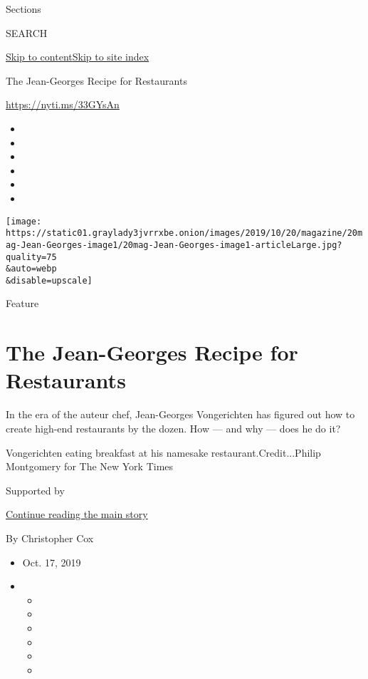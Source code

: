 Sections

SEARCH

\protect\hyperlink{site-content}{Skip to
content}\protect\hyperlink{site-index}{Skip to site index}

The Jean-Georges Recipe for Restaurants

\url{https://nyti.ms/33GYsAn}

\begin{itemize}
\item
\item
\item
\item
\item
\item
\end{itemize}

\texttt{[image: https://static01.graylady3jvrrxbe.onion/images/2019/10/20/magazine/20mag-Jean-Georges-image1/20mag-Jean-Georges-image1-articleLarge.jpg?quality=75\\\&auto=webp\\\&disable=upscale]}

Feature

\hypertarget{the-jean-georges-recipe-for-restaurants}{%
\section{The Jean-Georges Recipe for
Restaurants}\label{the-jean-georges-recipe-for-restaurants}}

In the era of the auteur chef, Jean-Georges Vongerichten has figured out
how to create high-end restaurants by the dozen. How --- and why ---
does he do it?

Vongerichten eating breakfast at his namesake restaurant.Credit...Philip
Montgomery for The New York Times

Supported by

\protect\hyperlink{after-sponsor}{Continue reading the main story}

By Christopher Cox

\begin{itemize}
\item
  Oct. 17, 2019
\item
  \begin{itemize}
  \item
  \item
  \item
  \item
  \item
  \item
  \end{itemize}
\end{itemize}

